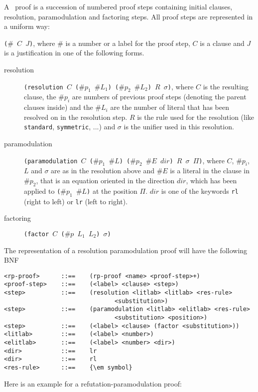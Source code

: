A \post\ proof is a succession of numbered proof steps containing initial clauses, resolution,
paramodulation and factoring steps. All proof steps are represented in a uniform way:\par\noindent
{\tt ($\#$ $C$ $J$)}, where $\#$ is a number or a label for the proof step, $C$ is a clause and $J$ 
is a justification in one of the following forms.
\begin{description}
\item[resolution] {\tt (resolution $C$  ($\#p_1$ $\#L_1$) ($\#p_2$ $\#L_2$) $R$ $\sigma$)}, where $C$ is the
resulting clause, the $\#p_i$ are numbers of previous proof steps (denoting the parent clauses inside) and
the $\#L_i$ are the number of literal that has been resolved on in the resolution step. $R$ is the rule 
used for the resolution (like {\tt standard}, {\tt symmetric}, ...) and  $\sigma$ is the
unifier used in this resolution.
\item[paramodulation] {\tt (paramodulation $C$ ($\#p_1$ $\#L$) ($\#p_2$ $\#E$ $dir$) $R$ $\sigma$ $\Pi$)}, where $C$,
$\#p_i$, $L$ and $\sigma$ are as in the resolution above and $\#E$ is a literal in the clause in $\#p_2$, that
is an equation oriented in the direction $dir$, which has been applied to {\tt ($\#p_1$ $\#L$)} at 
the position $\Pi$. $dir$ is one of the keywords {\tt rl} (right to left) or {\tt lr} (left to right).
\item[factoring] {\tt (factor $C$ ($\#p$ $L_1$ $L_2$) $\sigma$)}
\end{description}
The representation of a resolution paramodulation proof will have the following BNF
\begin{verbatim}
<rp-proof>      ::==    (rp-proof <name> <proof-step>+)
<proof-step>    ::==    (<label> <clause> <step>)
<step>          ::==    (resolution <litlab> <litlab> <res-rule>
                               <substitution>)
<step>          ::==    (paramodulation <litlab> <elitlab> <res-rule>
                               <substitution> <position>)
<step>          ::==    (<label> <clause> (factor <substitution>))
<litlab>        ::==    (<label> <number>)
<elitlab>       ::==    (<label> <number> <dir>)
<dir>           ::==    lr
<dir>           ::==    rl
<res-rule>      ::==    {\em symbol}
\end{verbatim}

Here is an example for a refutation-paramodulation proof:\par


